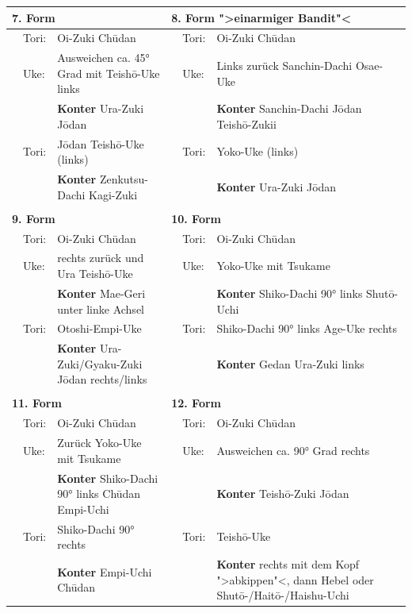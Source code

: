 \documentclass[a5paper,landscape,DIV=calc,11pt,notitlepage]{scrartcl}
\begin{document}
\pagebreak
\begin{tcolorbox}[colback=white,colframe=GKD,coltitle=white,adjusted title=Kurzbeschreibung Kumite-Ura 7..12]
	\null\vfill\null	
	{\small 	
		\begin{tabularx}{\textwidth}{lllllX}
			\multicolumn{3}{l}{\textbf{7. Form}}&\multicolumn{3}{l}{\textbf{8. Form ">einarmiger Bandit"<}}\\
			\midrule
			&Tori:	& Oi-Zuki Ch\={u}dan						&&Tori:	& Oi-Zuki Ch\={u}dan\\
			&Uke:	& Ausweichen ca. 45° Grad mit Teish\={o}-Uke links
																&&Uke:	& Links zurück Sanchin-Dachi Osae-Uke\\
			&		& \textbf{Konter} Ura-Zuki J\={o}dan		&&		& \textbf{Konter} Sanchin-Dachi J\={o}dan Teish\={o}-Zukii\\
			&Tori:	& J\={o}dan Teish\={o}-Uke (links)				&&Tori:	& Yoko-Uke (links)\\
			&		& \textbf{Konter} Zenkutsu-Dachi Kagi-Zuki	&&		& \textbf{Konter} Ura-Zuki J\={o}dan\\
			\midrule&&&&&\\
			\multicolumn{3}{l}{\textbf{9. Form}}&\multicolumn{3}{l}{\textbf{10. Form}}\\
			\midrule
			&Tori:	& Oi-Zuki Ch\={u}dan						&&Tori:	& Oi-Zuki Ch\={u}dan\\
			&Uke:	& rechts zurück	und Ura Teish\={o}-Uke			&&Uke:	& Yoko-Uke mit Tsukame \\
			&		& \textbf{Konter} Mae-Geri unter linke Achsel
																&&		& \textbf{Konter} Shiko-Dachi 90° links Shut\={o}-Uchi\\
			&Tori:	& Otoshi-Empi-Uke							&&Tori:	& Shiko-Dachi 90° links Age-Uke rechts\\
			&		& \textbf{Konter} Ura-Zuki/Gyaku-Zuki J\={o}dan	rechts/links
																&&		& \textbf{Konter} Gedan Ura-Zuki links\\
			\midrule&&&&&\\
			\multicolumn{3}{l}{\textbf{11. Form}}&\multicolumn{3}{l}{\textbf{12. Form}}\\
			\midrule
			&Tori:	& Oi-Zuki Ch\={u}dan						&&Tori:	& Oi-Zuki Ch\={u}dan\\
			&Uke:	& Zurück Yoko-Uke mit Tsukame				&&Uke:	& Ausweichen ca. 90° Grad rechts\\
			&		& \textbf{Konter} Shiko-Dachi 90° links Ch\={u}dan Empi-Uchi
																&&		& \textbf{Konter} Teish\={o}-Zuki J\={o}dan\\
			&Tori:	& Shiko-Dachi 90° rechts					&&Tori:	& Teish\={o}-Uke\\
			&		& \textbf{Konter} Empi-Uchi Ch\={u}dan		&&		& \textbf{Konter} rechts mit dem Kopf ">abkippen"<, dann Hebel oder Shut\={o}-/Hait\={o}-/Haishu-Uchi\\
			\midrule
		\end{tabularx}
	}\null\vfill\null
\end{tcolorbox}
\end{document}
